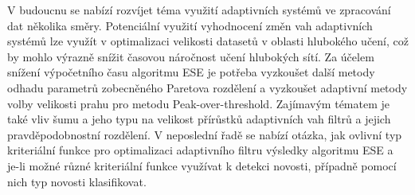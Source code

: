 \par
V budoucnu se nabízí rozvíjet téma využití adaptivních systémů ve zpracování dat několika směry. Potenciální využití vyhodnocení změn vah adaptivních systémů lze využít v optimalizaci velikosti datasetů v oblasti hlubokého učení, což by mohlo výrazně snížit časovou náročnost učení hlubokých sítí. Za účelem snížení výpočetního času algoritmu ESE je potřeba vyzkoušet další metody odhadu parametrů zobecněného Paretova rozdělení a vyzkoušet adaptivní metody volby velikosti prahu pro metodu Peak-over-threshold. Zajímavým tématem je také vliv šumu a jeho typu na velikost přírůstků adaptivních vah filtrů a jejich pravděpodobnostní rozdělení. V neposlední řadě se nabízí otázka, jak ovlivní typ kriteriální funkce pro optimalizaci adaptivního filtru výsledky algoritmu ESE a je-li možné různé kriteriální funkce využívat k detekci novosti, případně pomocí nich typ novosti klasifikovat. 